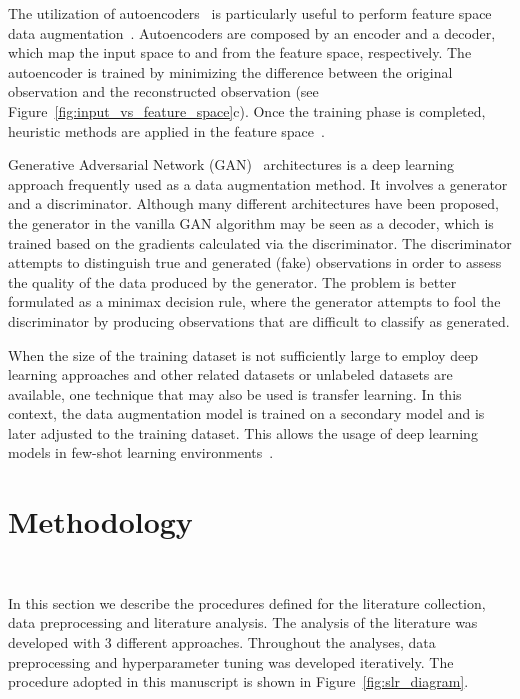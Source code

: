 \documentclass[parskip=full]{scrartcl}
\begin{document}
The utilization of autoencoders~\cite{Kramer1991} is particularly useful to
perform feature space data augmentation~\cite{Shorten2019}. Autoencoders are
composed by an encoder and a decoder, which map the input space to and from
the feature space, respectively. The autoencoder is trained by minimizing the
difference between the original observation and the reconstructed observation
(see Figure~\ref{fig:input_vs_feature_space}c). Once the training phase is
completed, heuristic methods are applied in the feature
space~\cite{DeVries2017}.

Generative Adversarial Network (GAN)~\cite{Goodfellow2014} architectures is a
deep learning approach frequently used as a data augmentation method. It
involves a generator and a discriminator. Although many different
architectures have been proposed, the generator in the vanilla GAN algorithm
may be seen as a decoder, which is trained based on the gradients calculated
via the discriminator. The discriminator attempts to distinguish true and
generated (fake) observations in order to assess the quality of the data
produced by the generator. The problem is better formulated as a minimax
decision rule, where the generator attempts to fool the discriminator by
producing observations that are difficult to classify as generated.

When the size of the training dataset is not sufficiently large to employ deep
learning approaches and other related datasets or unlabeled datasets are
available, one technique that may also be used is transfer learning. In this
context, the data augmentation model is trained on a secondary model and is
later adjusted to the training dataset. This allows the usage of deep learning
models in few-shot learning environments~\cite{Antoniou2017}.

% 
%
%

\section{Methodology}~\label{sec:methodology}

In this section we describe the procedures defined for the literature
collection, data preprocessing and literature analysis. The analysis of the
literature was developed with 3 different approaches. Throughout the
analyses, data preprocessing and hyperparameter tuning was developed
iteratively. The procedure adopted in this manuscript is shown in
Figure~\ref{fig:slr_diagram}.
\end{document}
